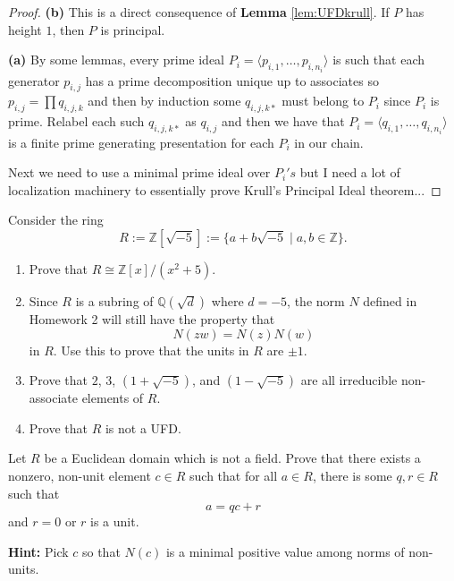 \documentclass[addpoints,10pt]{exam}
\theoremstyle{plain}
\theoremstyle{definition}
\newtheorem{prob}[thm]{Problem}
\theoremstyle{plain}
\theoremstyle{plain}
\theoremstyle{definition}
\let\oldprob\prob
\let\endoldprob\endprob
\renewenvironment{prob}
  {\begin{singlespace}\oldprob}
  {\endoldprob\end{singlespace}}
\newcommand{\QQ}{\ensuremath{\mathbb{Q}}}
\newcommand{\ZZ}{\ensuremath{\mathbb{Z}}}
\newcommand{\tbf}[1]{\textbf{ #1 }}
\begin{document}
\begin{proof}\textbf{(b)} This is a direct consequence of \textbf{Lemma }\ref{lem:UFDkrull}. If $P$ has height $1$, then $P$ is principal.

\textbf{(a)} By some lemmas, every prime ideal $P_{i}=\langle p_{i,1},\hdots, p_{i,n_{i}}\rangle$ is such that each generator $p_{i,j}$ has a prime decomposition unique up to associates so $p_{i,j}=\prod q_{i,j,k}$ and then by induction some $q_{i,j,k*}$ must belong to $P_{i}$ since $P_{i}$ is prime. Relabel each such $q_{i,j,k*}$ as $q_{i,j}$ and then we have that $P_{i}=\langle q_{i,1},\hdots, q_{i,n_{i}}\rangle$ is a finite prime generating presentation for each $P_{i}$ in our chain.

Next we need to use a minimal prime ideal over $P_{i}'s$ but I need a lot of localization machinery to essentially prove Krull's Principal Ideal theorem...


\end{proof}

\newpage
\begin{prob}
Consider the ring
$$
R := \ZZ[\sqrt{-5}] := \{a + b\sqrt{-5} \mid a,b \in \ZZ\}.
$$
\begin{enumerate}[label=(\alph*)]
\item Prove that $R \cong \ZZ[x]/(x^2+5)$.
\item Since $R$ is a subring of $\QQ(\sqrt{d})$ where $d=-5$, the norm $N$ defined in Homework 2 will still have the property that
$$
N(zw)=N(z)N(w)
$$
in $R$. Use this to prove that the units in $R$ are $\pm 1$.
\item Prove that $2$, $3$, $(1+\sqrt{-5})$, and $(1-\sqrt{-5})$ are all irreducible non-associate elements of $R$.
\item Prove that $R$ is not a UFD.
\end{enumerate}
\end{prob}

\newpage
\begin{prob}
Let $R$ be a Euclidean domain which is not a field. Prove that there exists a nonzero, non-unit element $c \in R$ such that for all $a \in R$, there is some $q,r \in R$ such that
$$
a = qc + r
$$
and $r=0$ or $r$ is a unit.

\tbf{Hint:} Pick $c$ so that $N(c)$ is a minimal positive value among norms of non-units.
\end{prob}
\end{document}
